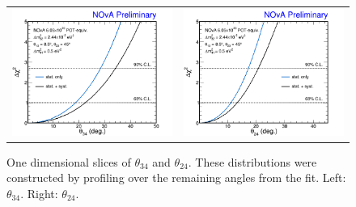 \begin{figure}[htbp]
  \centering
  \begin{tabular}{c c}
    \includegraphics[width=.47\textwidth]{figures/Fits/1DTh34.png} &
    \includegraphics[width=.47\textwidth]{figures/Fits/1DTh24.png} \\
  \end{tabular}
  \caption[One Dimensional $\theta_{34}$ and $\theta_{24}$ Slices]{One dimensional slices of $\theta_{34}$ and $\theta_{24}$. These distributions were constructed by profiling over the remaining angles from the fit. Left: $\theta_{34}$. Right: $\theta_{24}$.}
  \label{fig:Fit1D}
\end{figure}